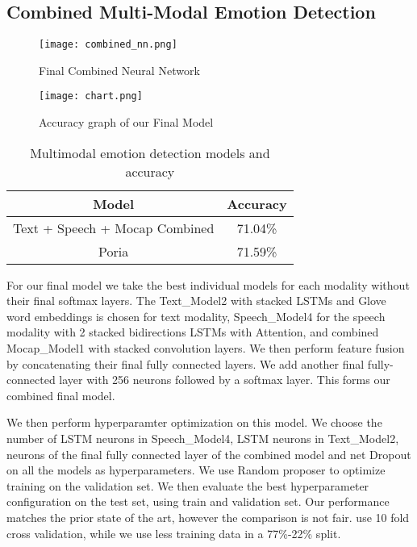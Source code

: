 \documentclass{article}
\begin{document}
\subsection{Combined Multi-Modal Emotion Detection}

\begin{figure}[!t]
\centering
\texttt{[image: combined\_nn.png]}
\hfil
\caption{Final Combined Neural Network}
\label{com_sim}
\end{figure}

\begin{figure}[!t]
\centering
\texttt{[image: chart.png]}
\caption{Accuracy graph of our Final Model}
\label{acc_fig}
\end{figure}

\begin{table}[!t]
\renewcommand{\arraystretch}{1.3}
\caption{Multimodal emotion detection models and accuracy}
\label{table_mocap}
\centering
\begin{tabular}{|c||c|}
\hline
Model & Accuracy\\
\hline
Text + Speech + Mocap Combined & 71.04\% \\
Poria \cite{poria2018multimodal} & 71.59\% \\
\hline
\end{tabular}
\end{table}

For our final model we take the best individual models for each modality without their final softmax layers. The Text\_Model2 with stacked LSTMs and Glove word embeddings is chosen for text modality, Speech\_Model4 for the speech modality with 2 stacked bidirections LSTMs with Attention, and combined Mocap\_Model1 with stacked convolution layers. We then perform feature fusion by concatenating their final fully connected layers. We add another final fully-connected layer with 256 neurons followed by a softmax layer. This forms our combined final model.

We then perform hyperparamter optimization on this model. We choose the number of LSTM neurons in Speech\_Model4, LSTM neurons in Text\_Model2, neurons of the final fully connected layer of the combined model and net Dropout on all the models as hyperparameters. We use Random proposer to optimize training on the validation set. We then evaluate the best hyperparameter configuration on the test set, using train and validation set. Our performance matches the prior state of the art, however the comparison is not fair. \cite{poria2018multimodal} use 10 fold cross validation, while we use less training data in a 77\%-22\% split. 
\end{document}
